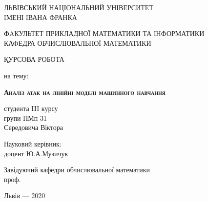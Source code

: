 \documentclass[a4paper,14pt]{extreport}
\begin{document}
	\begin{titlepage}%
    	\begin{center}
	    	{ЛЬВІВСЬКИЙ НАЦІОНАЛЬНИЙ УНІВЕРСИТЕТ \\ІМЕНІ ІВАНА ФРАНКА}\par
	       	{ФAКУЛЬТЕТ ПРИКЛАДНОЇ МАТЕМАТИКИ ТА ІНФОРМАТИКИ\\ КАФЕДРА ОБЧИСЛЮВАЛЬНОЇ МАТЕМАТИКИ}\par
			\begin{center}
	
	        \end{center}
	        \vspace{10mm}
	        \b{КУРСОВА РОБОТА}\par
	        {\small{на тему:}}\par
	        \vspace{20mm}
	        {\LARGE{\bf{\scshape{Аналіз атак на лінійні моделі машинного навчання}}}}\par
	        \vspace{5mm}
	        {}\par %
        \end{center}
	   	
	   	\vfill
	   	\hfill
		\begin{flushright}
   	   		\begin{minipage}[t]{80mm}
   	   			\flushright
	   	   		студента III курсу\\
	   	   		групи ПМп-31\\
	   	   		{Середовича Віктора}\par
	   	   		\vspace{2ex}
	   	   		Науковий керівник:\\
	   	   		{доцент Ю.А.Музичук}\\
   	   		\end{minipage}
   	   \end{flushright}
      
   	   \vspace{10mm}
   	   \begin{flushleft}
   	   \begin{minipage}[t]{80mm}
	   	   \flushleft
	   	   Завідуючий кафедри обчислювальної математики\\
	   	   проф.  
   	   \end{minipage}
   	   \end{flushleft}
   	   \vfill
   	   \vspace{10mm}
   	   
   	   \begin{center}Львів --- 2020\end{center}
    \end{titlepage}
	
\end{document}
